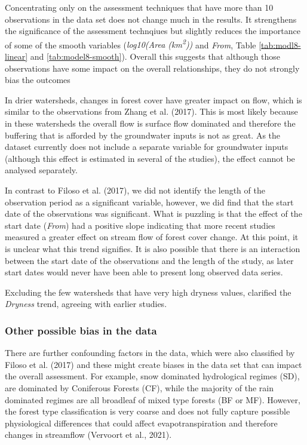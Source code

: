 \documentclass[]{elsarticle} %
\begin{document}
Concentrating only on the assessment techniques that have more than 10 observations in the data set does not change much in the results. It strengthens the significance of the assessment technqiues but slightly reduces the importance of some of the smooth variables (\emph{log10(Area (km\textsuperscript{2}))} and \emph{From}, Table \ref{tab:modl8-linear} and \ref{tab:model8-smooth}). Overall this suggests that although those observations have some impact on the overall relationships, they do not strongly bias the outcomes

In drier watersheds, changes in forest cover have greater impact on flow, which is similar to the observations from Zhang et al. (2017). This is most likely because in these watersheds the overall flow is surface flow dominated and therefore the buffering that is afforded by the groundwater inputs is not as great. As the dataset currently does not include a separate variable for groundwater inputs (although this effect is estimated in several of the studies), the effect cannot be analysed separately.

In contrast to Filoso et al. (2017), we did not identify the length of the observation period as a significant variable, however, we did find that the start date of the observations was significant. What is puzzling is that the effect of the start date (\emph{From}) had a positive slope indicating that more recent studies measured a greater effect on stream flow of forest cover change. At this point, it is unclear what this trend signifies. It is also possible that there is an interaction between the start date of the observations and the length of the study, as later start dates would never have been able to present long observed data series.

Excluding the few watersheds that have very high dryness values, clarified the \emph{Dryness} trend, agreeing with earlier studies.

\hypertarget{other-possible-bias-in-the-data}{%
\subsubsection{Other possible bias in the data}\label{other-possible-bias-in-the-data}}

There are further confounding factors in the data, which were also classified by Filoso et al. (2017) and these might create biases in the data set that can impact the overall assessment. For example, snow dominated hydrological regimes (SD), are dominated by Coniferous Forests (CF), while the majority of the rain dominated regimes are all broadleaf of mixed type forests (BF or MF). However, the forest type classification is very coarse and does not fully capture possible physiological differences that could affect evapotranspiration and therefore changes in streamflow (Vervoort et al., 2021).
\end{document}

